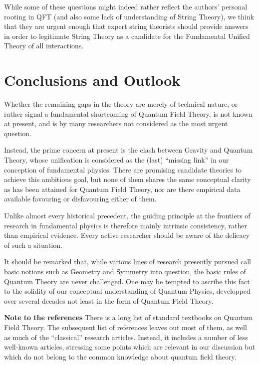 \documentclass[multphys,vecphys]{svmult}
\begin{document}
While some of these questions might indeed rather reflect the authors'
personal rooting in QFT (and also some lack of understanding of String
Theory), we think that they are urgent enough that expert string
theorists should provide answers in order to legitimate String Theory
as a candidate for the Fundamental Unified Theory of all interactions. 

\section{Conclusions and Outlook}

Whether the remaining gaps in the theory are merely of technical
nature, or rather signal a fundamental shortcoming of Quantum Field
Theory, is not known at present, and is by many researchers not
considered as the most urgent question. 

Instead, the prime concern at present is the clash between Gravity 
and Quantum Theory, whose unification is considered as the (last)
``missing link'' in our conception of fundamental physics.
There are promising candidate theories to achieve this ambitious goal,
but none of them shares the same conceptual clarity as has been
attained for Quantum Field Theory, nor are there empirical data
available favouring or disfavouring either of them. 

Unlike almost every historical precedent, the guiding principle at the 
frontiers of research in fundamental physics is therefore mainly
intrinsic consistency, rather than empirical evidence. Every active
researcher should be aware of the delicacy of such a situation.

It should be remarked that, while various lines of research presently
pursued call basic notions such as Geometry and Symmetry into
question, the basic rules of Quantum Theory are never challenged.  
One may be tempted to ascribe this fact to the solidity of our
conceptual understanding of Quantum Physics, developped over several 
decades not least in the form of Quantum Field Theory.

\vskip15mm\newpage
{\large\bf Note to the references} 
\vskip3mm
There is a long list of standard textbooks on Quantum Field Theory. The
subsequent list of references leaves out most of them, as well as much
of the ``classical'' research articles. Instead, it includes a number
of less well-known articles, stressing some points which are relevant in our
discussion but which do not belong to the common knowledge about
quantum field theory. 
\end{document}
